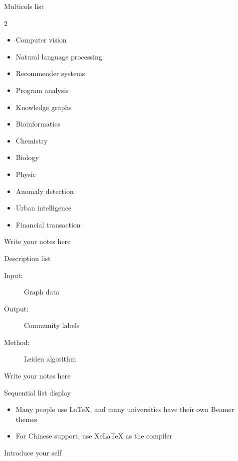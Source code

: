 \documentclass[aspectratio=169]{beamer}
\begin{document}
        \begin{frame}{Multicols list}
            \begin{multicols}{2} %
                \begin{itemize}
                    \item Computer vision
                    \item Natural language processing
                    \item Recommender systems
                    \item Program analysis
                    \item Knowledge graphs
                    \item Bioinformatics
                    \item Chemistry
                    \item Biology
                    \item Physic
                    \item Anomaly detection
                    \item Urban intelligence
                    \item Financial transaction
                \end{itemize}
            \end{multicols}

            \begin{note}
                {Write your notes here}
            \end{note}
        \end{frame}
        
        \begin{frame}{Description list}
            \begin{description}
                \item[Input:] Graph data
                \item[Output:] Community labels
                \item[Method:] Leiden algorithm
            \end{description}

            \begin{note}
                {Write your notes here}
            \end{note}
        \end{frame}

        \begin{frame}{Sequential list display}
            \begin{itemize}[<+-| alert@+>]
                \item Many people use \LaTeX{}, and many universities have their own Beamer themes
                \item For Chinese support, use Xe\LaTeX{} as the compiler
            \end{itemize}

            \begin{note}
                {Introduce your self}
            \end{note}
        \end{frame}
\end{document}
